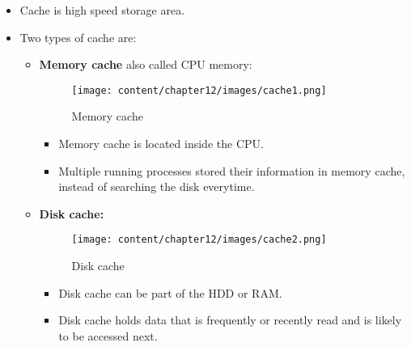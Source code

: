 \setlength{\columnsep}{3pt}
\begin{flushleft}

\begin{itemize}
	\item Cache is high speed storage area.
	\item Two types of cache are:
	\begin{itemize}
		\item \textbf{Memory cache} also called CPU memory:
		\begin{figure}[h!]
			\centering
			\texttt{[image: content/chapter12/images/cache1.png]}
			\caption{Memory cache}
			\label{fig:cache1}
		\end{figure}
		\begin{itemize}
			\item Memory cache is located inside the CPU.
			\item Multiple running processes stored their information in memory cache, instead of searching the disk everytime.
		\end{itemize}
		\item \textbf{Disk cache:} 
		\begin{figure}[h!]
			\centering
			\texttt{[image: content/chapter12/images/cache2.png]}
			\caption{Disk cache}
			\label{fig:cache2}
		\end{figure}
		\begin{itemize}
			\item Disk cache can be part of the HDD or RAM. 
			\item Disk cache holds data that is frequently or recently read and is likely to be accessed next.
		\end{itemize}
	\end{itemize}
\end{itemize}

\end{flushleft}

\newpage



